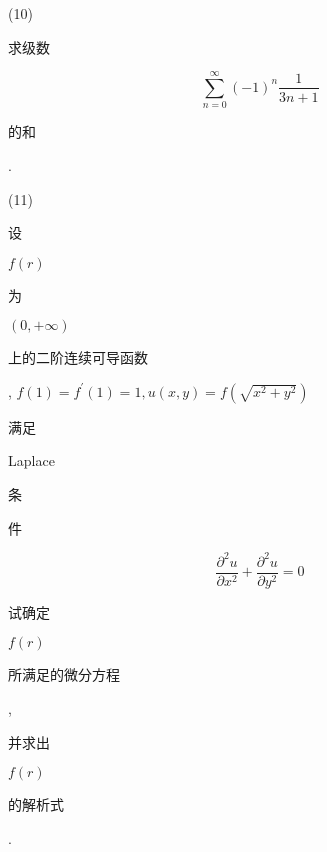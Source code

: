 \documentclass[10pt]{article}
\begin{document}
(10) \begin{CJK}{UTF8}{mj}求级数\end{CJK}
$$
\sum_{n=0}^{\infty}(-1)^{n} \frac{1}{3 n+1}
$$
\begin{CJK}{UTF8}{mj}的和\end{CJK}.

(11) \begin{CJK}{UTF8}{mj}设\end{CJK} $f(r)$ \begin{CJK}{UTF8}{mj}为\end{CJK} $(0,+\infty)$ \begin{CJK}{UTF8}{mj}上的二阶连续可导函数\end{CJK}, $f(1)=f^{\prime}(1)=1, u(x, y)=f\left(\sqrt{x^{2}+y^{2}}\right)$ \begin{CJK}{UTF8}{mj}满足\end{CJK} Laplace \begin{CJK}{UTF8}{mj}条\end{CJK} \begin{CJK}{UTF8}{mj}件\end{CJK}
$$
\frac{\partial^{2} u}{\partial x^{2}}+\frac{\partial^{2} u}{\partial y^{2}}=0
$$
\begin{CJK}{UTF8}{mj}试确定\end{CJK} $f(r)$ \begin{CJK}{UTF8}{mj}所满足的微分方程\end{CJK}, \begin{CJK}{UTF8}{mj}并求出\end{CJK} $f(r)$ \begin{CJK}{UTF8}{mj}的解析式\end{CJK}.
\end{document}

